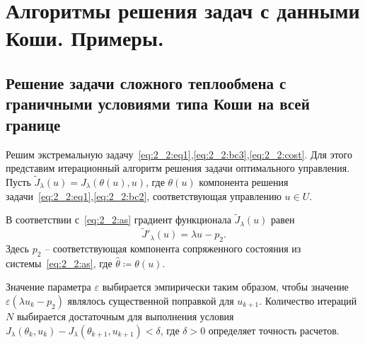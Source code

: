 \section{Алгоритмы решения задач с данными Коши. Примеры.}\label{sec:ch4/sec4}

\subsection{
    Решение задачи сложного теплообмена
    с граничными условиями типа Коши на всей границе
}\label{subsec:ch4/sec4/subsec1}

Решим экстремальную задачу~\eqref{eq:2_2:eq1},\eqref{eq:2_2:bc3},\eqref{eq:2_2:cost}.
Для этого представим итерационный алгоритм решения задачи оптимального управления.
Пусть $\tilde J_\lambda(u)=J_\lambda(\theta(u), u)$, где $\theta(u)$ компонента решения
задачи~\eqref{eq:2_2:eq1},\eqref{eq:2_2:bc2}, соответствующая управлению $u\in U$.

В соответствии с~\eqref{eq:2_2:as} градиент функционала $\tilde J_\lambda(u)$ равен
\[
    \tilde J'_\lambda (u) = \lambda u - p_2.
\]
Здесь $p_2$ -- соответствующая компонента сопряженного
состояния из системы~\eqref{eq:2_2:as}, где $\hat{\theta}\coloneqq\theta(u)$.


Значение параметра $\varepsilon$ выбирается эмпирически таким образом, чтобы значение
$\varepsilon (\lambda u_k - p_2)$ являлось существенной поправкой для $u_{k+1}$.
Количество итераций $N$ выбирается достаточным для выполнения условия
$J_\lambda(\theta_k, u_k) - J_\lambda(\theta_{k+1}, u_{k+1}) < \delta$, где $\delta>0$
определяет точность расчетов.

